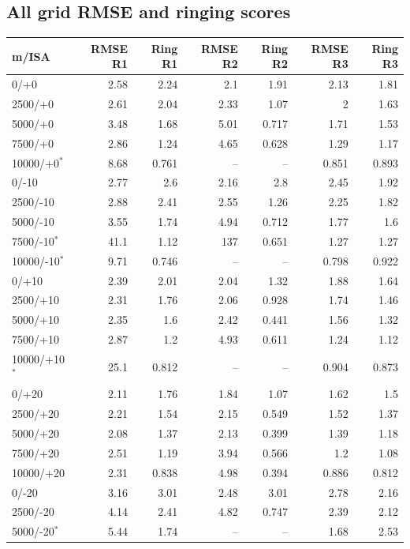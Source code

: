 \documentclass[11pt,a4paper]{article}
\begin{document}
\subsection{All grid RMSE and ringing scores}
\begin{table}[H]\centering\small\setlength{\tabcolsep}{5pt}
\begin{tabular}{@{}lrrrrrr@{}}\toprule
m/ISA & RMSE R1 & Ring R1 & RMSE R2 & Ring R2 & RMSE R3 & Ring R3\\\midrule
0/+0 & 2.58 & 2.24 & 2.1 & 1.91 & 2.13 & 1.81\\
2500/+0 & 2.61 & 2.04 & 2.33 & 1.07 & 2 & 1.63\\
5000/+0 & 3.48 & 1.68 & 5.01 & 0.717 & 1.71 & 1.53\\
7500/+0 & 2.86 & 1.24 & 4.65 & 0.628 & 1.29 & 1.17\\
10000/+0$^*$ & 8.68 & 0.761 & -- & -- & 0.851 & 0.893\\
0/-10 & 2.77 & 2.6 & 2.16 & 2.8 & 2.45 & 1.92\\
2500/-10 & 2.88 & 2.41 & 2.55 & 1.26 & 2.25 & 1.82\\
5000/-10 & 3.55 & 1.74 & 4.94 & 0.712 & 1.77 & 1.6\\
7500/-10$^*$ & 41.1 & 1.12 & 137 & 0.651 & 1.27 & 1.27\\
10000/-10$^*$ & 9.71 & 0.746 & -- & -- & 0.798 & 0.922\\
0/+10 & 2.39 & 2.01 & 2.04 & 1.32 & 1.88 & 1.64\\
2500/+10 & 2.31 & 1.76 & 2.06 & 0.928 & 1.74 & 1.46\\
5000/+10 & 2.35 & 1.6 & 2.42 & 0.441 & 1.56 & 1.32\\
7500/+10 & 2.87 & 1.2 & 4.93 & 0.611 & 1.24 & 1.12\\
10000/+10$^*$ & 25.1 & 0.812 & -- & -- & 0.904 & 0.873\\
0/+20 & 2.11 & 1.76 & 1.84 & 1.07 & 1.62 & 1.5\\
2500/+20 & 2.21 & 1.54 & 2.15 & 0.549 & 1.52 & 1.37\\
5000/+20 & 2.08 & 1.37 & 2.13 & 0.399 & 1.39 & 1.18\\
7500/+20 & 2.51 & 1.19 & 3.94 & 0.566 & 1.2 & 1.08\\
10000/+20 & 2.31 & 0.838 & 4.98 & 0.394 & 0.886 & 0.812\\
0/-20 & 3.16 & 3.01 & 2.48 & 3.01 & 2.78 & 2.16\\
2500/-20 & 4.14 & 2.41 & 4.82 & 0.747 & 2.39 & 2.12\\
5000/-20$^*$ & 5.44 & 1.74 & -- & -- & 1.68 & 2.53\\

\end{tabular}
\end{table}
\end{document}
